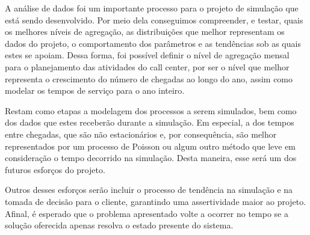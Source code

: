 A análise de dados foi um importante processo para o projeto de simulação que está sendo desenvolvido. Por meio dela conseguimos compreender, e testar, quais os melhores níveis de agregação, as distribuições que melhor representam os dados do projeto, o comportamento dos parâmetros e as tendências sob as quais estes se apoiam. Dessa forma, foi possível definir o nível de agregação mensal para o planejamento das atividades do call center, por ser o nível que melhor representa o crescimento do número de chegadas ao longo do ano, assim como modelar os tempos de serviço para o ano inteiro.

Restam como etapas a modelagem dos processos a serem simulados, bem como dos dados que estes receberão durante a simulação. Em especial, a dos tempos entre chegadas, que são não estacionários e, por consequência, são melhor representados por um processo de Poisson ou algum outro método que leve em consideração o tempo decorrido na simulação. Desta maneira, esse será um dos futuros esforços do projeto.

Outros desses esforços serão incluir o processo de tendência na simulação e na tomada de decisão para o cliente, garantindo uma assertividade maior ao projeto. Afinal, é esperado que o problema apresentado volte a ocorrer no tempo se a solução oferecida apenas resolva o estado presente do sistema.